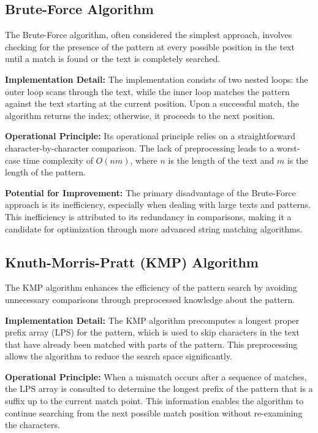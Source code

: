 \documentclass{article}
\begin{document}
\subsection{Brute-Force Algorithm}

The Brute-Force algorithm, often considered the simplest approach, involves checking for the presence of the pattern at every possible position in the text until a match is found or the text is completely searched.

\textbf{Implementation Detail:}
The implementation consists of two nested loops: the outer loop scans through the text, while the inner loop matches the pattern against the text starting at the current position. Upon a successful match, the algorithm returns the index; otherwise, it proceeds to the next position.

\textbf{Operational Principle:}
Its operational principle relies on a straightforward character-by-character comparison. The lack of preprocessing leads to a worst-case time complexity of $O(nm)$, where $n$ is the length of the text and $m$ is the length of the pattern.

\textbf{Potential for Improvement:}
The primary disadvantage of the Brute-Force approach is its inefficiency, especially when dealing with large texts and patterns. This inefficiency is attributed to its redundancy in comparisons, making it a candidate for optimization through more advanced string matching algorithms.

\subsection{Knuth-Morris-Pratt (KMP) Algorithm}

The KMP algorithm enhances the efficiency of the pattern search by avoiding unnecessary comparisons through preprocessed knowledge about the pattern.

\textbf{Implementation Detail:}
The KMP algorithm precomputes a longest proper prefix array (LPS) for the pattern, which is used to skip characters in the text that have already been matched with parts of the pattern. This preprocessing allows the algorithm to reduce the search space significantly.

\textbf{Operational Principle:}
When a mismatch occurs after a sequence of matches, the LPS array is consulted to determine the longest prefix of the pattern that is a suffix up to the current match point. This information enables the algorithm to continue searching from the next possible match position without re-examining the characters.
\end{document}
